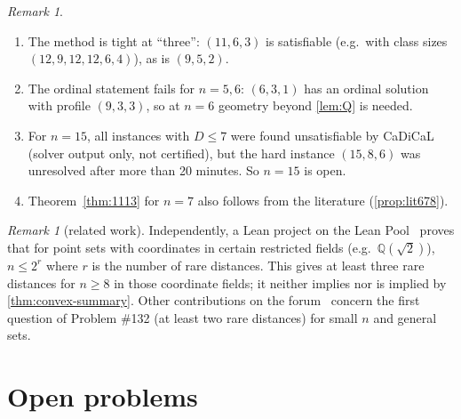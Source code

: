 \documentclass[11pt]{amsart}
\theoremstyle{definition}
\theoremstyle{remark}
\newtheorem{remark}[theorem]{Remark}
\begin{document}
\begin{remark}\label{rem:ordinal}
\begin{enumerate}[leftmargin=2em,label=(\alph*)]
\item The method is tight at ``three'': $(11,6,3)$ is satisfiable (e.g.\ with class sizes $(12,9,12,12,6,4)$), as is $(9,5,2)$.
\item The ordinal statement fails for $n=5,6$: $(6,3,1)$ has an ordinal solution with profile $(9,3,3)$, so at $n=6$ geometry beyond \cref{lem:Q} is needed.
\item For $n=15$, all instances with $D\le7$ were found unsatisfiable by CaDiCaL (solver output only, not certified), but the hard instance $(15,8,6)$ was unresolved after more than 20 minutes. So $n=15$ is open.
\item Theorem~\ref{thm:1113} for $n=7$ also follows from the literature (\cref{prop:lit678}).
\end{enumerate}
\end{remark}

\begin{remark}[related work]
Independently, a Lean project on the Lean Pool~\cite{lyfar} proves that for point sets with coordinates in certain restricted fields (e.g.\ $\mathbb Q(\sqrt2)$), $n\le2^r$ where $r$ is the number of rare distances. This gives at least three rare distances for $n\ge8$ in those coordinate fields; it neither implies nor is implied by \cref{thm:convex-summary}. Other contributions on the forum~\cite{forum132} concern the first question of Problem \#132 (at least two rare distances) for small $n$ and general sets.
\end{remark}

\section{Open problems}\label{sec:open}
\end{document}
